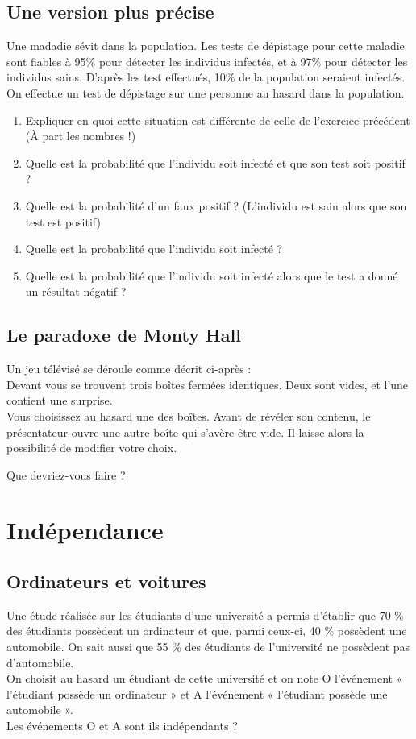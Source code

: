 \documentclass[oneside,12pt]{article}          %
\begin{document}
\subsection{Une version plus précise}
 Une madadie sévit dans la population. Les tests de dépistage pour cette maladie sont fiables à 95$\%$ pour détecter les individus infectés, et à 97$\%$ pour détecter les individus sains. D'après les test effectués, 10$\%$ de la population seraient infectés. \\
On effectue un test de dépistage sur une personne au hasard dans la population.
\begin{enumerate}
    \item Expliquer en quoi cette situation est différente de celle de l'exercice précédent (À part les nombres !)
    \item Quelle est la probabilité que l'individu soit infecté et que son test soit positif ?
    \item Quelle est la probabilité d'un faux positif ? (L'individu est sain alors que son test est positif)
    \item Quelle est la probabilité que l'individu soit infecté ?
    \item Quelle est la probabilité que l'individu soit infecté alors que le test a donné un résultat négatif ?
\end{enumerate}



\subsection{Le paradoxe de Monty Hall}
Un jeu télévisé se déroule comme décrit ci-après :\\
Devant vous se trouvent trois boîtes fermées identiques. Deux sont vides, et l'une contient une surprise.\\
Vous choisissez au hasard une des boîtes. Avant de révéler son contenu, le présentateur ouvre une autre boîte qui s'avère être vide. Il laisse alors la possibilité de modifier votre choix.

Que devriez-vous faire ?



\section{Indépendance}

\subsection{Ordinateurs et voitures}
 Une étude réalisée sur les étudiants d’une université a permis d’établir que 70 $\%$ des étudiants possèdent un ordinateur et que, parmi ceux-ci, 40 $\%$ possèdent une automobile. On sait aussi que 55 $\%$ des étudiants de l’université ne possèdent pas d’automobile. \\
On choisit au hasard un étudiant de cette université et on note O l’événement « l’étudiant possède un ordinateur » et A l’événement « l’étudiant possède une automobile ». \\
Les événements O et A sont ils indépendants ?
\end{document}
